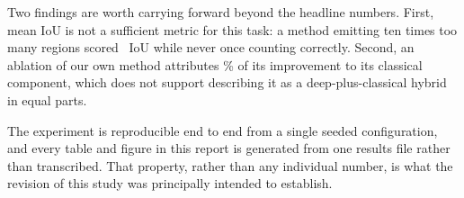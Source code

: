 \documentclass[12pt, a4paper]{article}
\begin{document}
Two findings are worth carrying forward beyond the headline numbers.  First,
mean IoU is not a sufficient metric for this task: a method emitting ten times
too many regions scored \KmIoU\ IoU while never once counting correctly.
Second, an ablation of our own method attributes \watershedShare\% of its
improvement to its classical component, which does not support describing it
as a deep-plus-classical hybrid in equal parts.

The experiment is reproducible end to end from a single seeded configuration,
and every table and figure in this report is generated from one results file
rather than transcribed.  That property, rather than any individual number, is
what the revision of this study was principally intended to establish.
\newpage
\printbibliography
\end{document}
